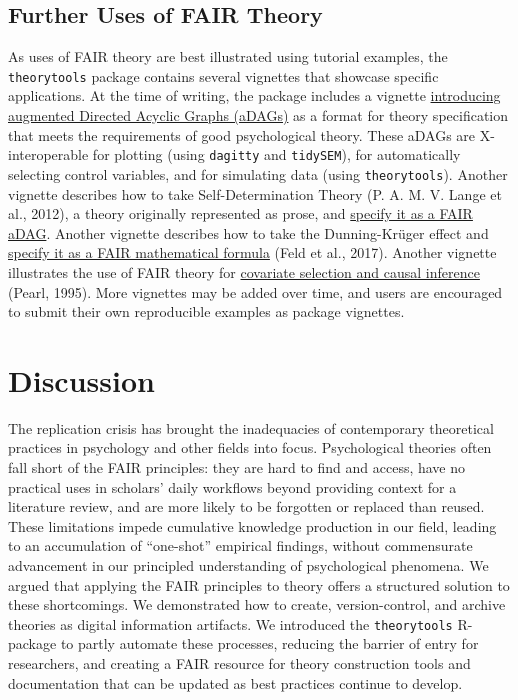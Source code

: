 \documentclass[
  man, noextraspace,floatsintext]{apa7}
\begin{document}
\subsection{Further Uses of FAIR Theory}\label{further-uses-of-fair-theory}

As uses of FAIR theory are best illustrated using tutorial examples,
the \texttt{theorytools} package contains several vignettes that showcase specific applications.
At the time of writing, the package includes a
vignette \href{https://cjvanlissa.github.io/theorytools/articles/augmented_dags.html}{introducing augmented Directed Acyclic Graphs (aDAGs)} as a format for theory specification that meets the requirements of good psychological theory.
These aDAGs are X-interoperable for plotting (using \texttt{dagitty} and \texttt{tidySEM}),
for automatically selecting control variables, and for simulating data (using \texttt{theorytools}).
Another vignette describes how to take Self-Determination Theory (P. A. M. V. Lange et al., 2012), a theory originally represented as prose, and \href{https://cjvanlissa.github.io/theorytools/articles/formalizing_sdt.html}{specify it as a FAIR aDAG}.
Another vignette describes how to take the Dunning-Krüger effect and \href{https://cjvanlissa.github.io/theorytools/articles/dunning-kruger.html}{specify it as a FAIR mathematical formula} (Feld et al., 2017).
Another vignette illustrates the use of FAIR theory for \href{https://cjvanlissa.github.io/theorytools/articles/causal-inference.html}{covariate selection and causal inference} (Pearl, 1995).
More vignettes may be added over time, and users are encouraged to submit their own reproducible examples as package vignettes.

\section{Discussion}\label{discussion}

The replication crisis has brought the inadequacies of contemporary theoretical practices in psychology and other fields into focus.
Psychological theories often fall short of the FAIR principles:
they are hard to find and access, have no practical uses in scholars' daily workflows beyond providing context for a literature review,
and are more likely to be forgotten or replaced than reused.
These limitations impede cumulative knowledge production in our field,
leading to an accumulation of ``one-shot'' empirical findings, without commensurate advancement in our principled understanding of psychological phenomena.
We argued that applying the FAIR principles to theory offers a structured solution to these shortcomings.
We demonstrated how to create, version-control, and archive theories as digital information artifacts.
We introduced the \texttt{theorytools} R-package to partly automate these processes, reducing the barrier of entry for researchers,
and creating a FAIR resource for theory construction tools and documentation that can be updated as best practices continue to develop.
\end{document}
